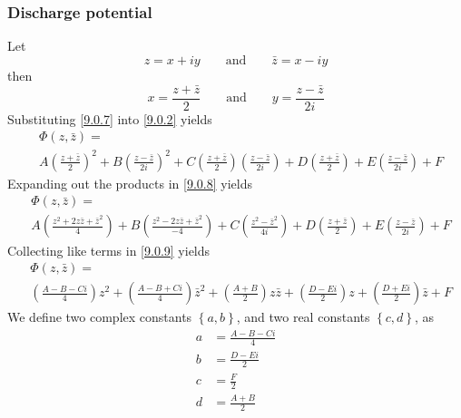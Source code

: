 \documentclass[12pt]{report}
\begin{document}
\subsubsection{Discharge potential}
Let
%
\begin{equation}\label{9.0.6}
    z = x + iy
    \qquad\text{and}\qquad
    \bar{z} = x - iy
\end{equation}
%
then
%
\begin{equation}\label{9.0.7}
    x = \frac{z + \bar{z}}{2}
    \qquad\text{and}\qquad
    y = \frac{z - \bar{z}}{2i}
\end{equation}
%
Substituting \eqref{9.0.7} into \eqref{9.0.2} yields
%
\begin{equation}\label{9.0.8}
    \begin{split}&\Phi(z,\bar{z}) = \\
    &
    A\left(\frac{z+\bar{z}}{2}\right)^2 + B\left(\frac{z-\bar{z}}{2i}\right)^2 +
    C\left(\frac{z+\bar{z}}{2}\right)\left(\frac{z-\bar{z}}{2i}\right) +
    D\left(\frac{z+\bar{z}}{2}\right) + E\left(\frac{z-\bar{z}}{2i}\right) + F
    \end{split}
\end{equation}
%
Expanding out the products in \eqref{9.0.8} yields
%
\begin{equation}\label{9.0.9}
    \begin{split}&\Phi(z,\bar{z}) = \\
    &
    A\left(\frac{z^2+2z\bar{z}+\bar{z}^2}{4}\right) + B\left(\frac{z^2-2z\bar{z}+\bar{z}^2}{-4}\right) +
    C\left(\frac{z^2-\bar{z}^2}{4i}\right) +
    D\left(\frac{z+\bar{z}}{2}\right) + E\left(\frac{z-\bar{z}}{2i}\right) + F
    \end{split}
\end{equation}
%
Collecting like terms in \eqref{9.0.9} yields
%
\begin{equation}\label{9.0.10}
    \begin{split}&\Phi(z,\bar{z}) = \\
    &
    \left(\frac{A-B-Ci}{4}\right) z^2 +
    \left(\frac{A-B+Ci}{4}\right) \bar{z}^2 +
    \left(\frac{A+B}{2}\right) z\bar{z} +
    \left(\frac{D-Ei}{2}\right) z +
    \left(\frac{D+Ei}{2}\right) \bar{z} +
    F
    \end{split}
\end{equation}
%
We define two complex constants $\left\{ a, b \right\}$, and two real constants $\left\{ c, d \right\}$, as
%
\begin{align}
    a &= \frac{A-B-Ci}{4} \label{9.0.11}\\
    b &= \frac{D-Ei}{2} \label{9.0.12}\\
    c &= \frac{F}{2} \label{9.0.13}\\
    d &= \frac{A+B}{2} \label{9.0.14}
\end{align}
\end{document}
